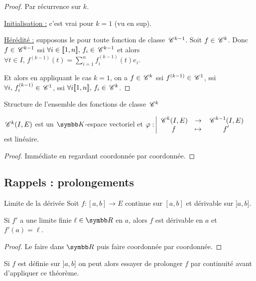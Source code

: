 
\begin{proof}
    Par récurrence sur $k$. 

    \uline{Initialisation :} c'est vrai pour $k = 1$ (vu en sup).

    \uline{Hérédité :} supposons le pour toute fonction de classe $\,\mathscr C^{k - 1} $. Soit 
    $f \in \,\mathscr C^{k}$. Donc $f \in \,\mathscr C^{k-1}$ ssi $\forall i \in [\![1, n]\!], \, f_i \in \,\mathscr C^{k-1}$ 
    et alors $\displaystyle \forall t \in I, \, f^{(k-1)}(t) = \sum_{i=1}^n f_i^{(k-1)}(t)e_i$.

    Et alors en appliquant le cas $k = 1$, on a $f \in \,\mathscr C^{k}$ ssi $f^{(k-1)} \in \,\mathscr C^{1}$, 
    ssi $\forall i, \, f_i^{(k-1)} \in \,\mathscr C^{1}$, ssi $\forall i [\![1, n]\!], \, f_i \in \,\mathscr C^{k}$.
\end{proof}

\begin{proposition}{Structure de l'ensemble des fonctions de classe $\,\mathscr C^{k}$}{}

    $\,\mathscr C^{k}(I, E)$ est un $\K$-espace vectoriel et
    $\varphi: \space \begin{array}{|ccc} \displaystyle \,\mathscr C^{k}(I, E) & \to & \displaystyle \,\mathscr C^{k-1}(I, E) \\ \displaystyle f & \mapsto & \displaystyle f' \end{array}$ est linéaire.
\end{proposition}

\begin{proof}
    Immédiate en regardant coordonnée par coordonnée.
\end{proof}

\subsection{Rappels : prolongements}

\begin{theoreme}{Limite de la dérivée}{}
    Soit $f : [a, b] \to E$ continue sur $[a, b]$ et dérivable sur $]a, b]$. 

    Si $f'$ a une limite finie $\ell \in \R$ en $a$, alors $f$ est dérivable en $a$ et $f'(a) = \ell$.
\end{theoreme}

\begin{proof}
    Le faire dans $\R$ puis faire coordonnée par coordonnée.
\end{proof}

\begin{remarque}
    Si $f$ est définie sur $]a,b]$ on peut alors essayer de prolonger $f$ par continuité avant d'appliquer ce théorème.
\end{remarque}

